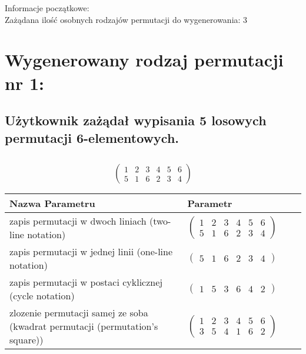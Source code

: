 \documentclass[12pt]{article}
\begin{document}
 
\begin{flushleft}
Informacje początkowe:\\[\baselineskip]
Zażądana ilość osobnych rodzajów permutacji do wygenerowania: 3
\end{flushleft}
\hfill
\section{Wygenerowany rodzaj permutacji nr 1:}
\subsection*{Użytkownik zażądał wypisania 5 losowych permutacji 6-elementowych.}

\subsection{}
\begin{center}
\[
\begin{pmatrix}
	1 & 2 & 3 & 4 & 5 & 6 \\ 
	5 & 1 & 6 & 2 & 3 & 4 
\end{pmatrix}
\]

\begin{tabular}{|m{0.6\linewidth}|m{0.4\linewidth}|}
	\hline
	Nazwa Parametru & Parametr \\
	\hline
	zapis permutacji w dwoch liniach (two-line notation) & $\begin{pmatrix} 1 & 2 & 3 & 4 & 5 & 6 \\ 
5 & 1 & 6 & 2 & 3 & 4 \end{pmatrix}$ \\ 
	\hline
	zapis permutacji w jednej linii (one-line notation) & $\begin{pmatrix} 5 & 1 & 6 & 2 & 3 & 4 \end{pmatrix}$ \\ 
	\hline
	zapis permutacji w postaci cyklicznej (cycle notation) & $\begin{pmatrix} 1 & 5 & 3 & 6 & 4 & 2 \end{pmatrix} $ \\ 
	\hline
	zlozenie permutacji samej ze soba (kwadrat permutacji (permutation's square)) & $\begin{pmatrix} 1 & 2 & 3 & 4 & 5 & 6 \\ 
3 & 5 & 4 & 1 & 6 & 2 \end{pmatrix}$ \\ 
	\hline
\end{tabular}
\end{center}
\end{document}
